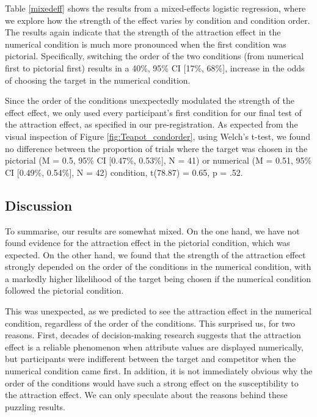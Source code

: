 \documentclass[11pt,a4paper]{article}
\begin{document}
Table \ref{mixedeff} shows the results from a  mixed-effects logistic regression, where we explore how the strength of the effect varies by condition and condition order.  The results again indicate that the strength of the attraction effect in the numerical condition is much more pronounced when the first condition was pictorial. Specifically, switching the order of the two conditions (from numerical first to pictorial first) results in a 40\%, 95\% CI [17\%, 68\%], increase in the odds of choosing the target in the numerical condition. 

Since the order of the conditions unexpectedly modulated the strength of the effect effect, we only used every participant's first condition for our final test of the attraction effect, as specified in our pre-registration. As expected from the visual inspection of Figure \ref{fig:Teapot_condorder}, using Welch's t-test, we found no difference between the proportion of trials where the target was chosen in the pictorial (M = 0.5, 95\% CI [0.47\%, 0.53\%], N = 41) or numerical (M = 0.51, 95\% CI [0.49\%, 0.54\%], N = 42) condition, t(78.87) = 0.65, p = .52.

\subsection{Discussion}

To summarise, our results are somewhat mixed. On the one hand, we have not found evidence for the attraction effect in the pictorial condition, which was expected. On the other hand, we found that the strength of the attraction effect strongly depended on the order of the conditions in the numerical condition, with a markedly higher likelihood of the target being chosen if the numerical condition followed the pictorial condition. 

This was unexpected, as we predicted to see the attraction effect in the numerical condition, regardless of the order of the conditions. This surprised us, for two reasons. First, decades of decision-making research suggests that the attraction effect is a reliable phenomenon when attribute values are displayed numerically, but participants were indifferent between the target and competitor when the numerical condition came first. In addition, it is not immediately obvious why the order of the conditions would have such a strong effect on the susceptibility to the attraction effect. We can only speculate about the reasons behind these puzzling results.
\end{document}
